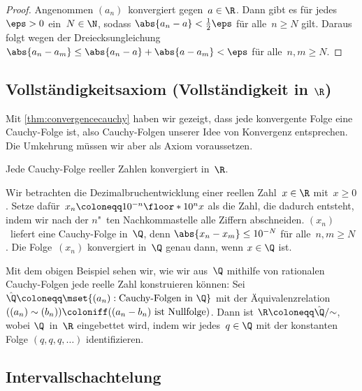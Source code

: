 \documentclass[a4paper]{article}
\begin{document}
\begin{proof}
    Angenommen $(a_n)$~konvergiert gegen~$a \in \R$. Dann gibt es für jedes~$\eps > 0$ ein~$N \in \N$, sodass $\abs{a_n - a} < \frac{1}{2}\eps$ für alle~$n \geq N$ gilt. Daraus folgt wegen der Dreiecksungleichung $\abs{a_n - a_m} \leq \abs{a_n - a} + \abs{a - a_m} < \eps$ für alle~$n, m \geq N$.
\end{proof}

\subsection{Vollständigkeitsaxiom (Vollständigkeit in \texorpdfstring{$\R$}{R})}\label{subsec:completeness}

Mit \cref{thm:convergencecauchy} haben wir gezeigt, dass jede konvergente Folge eine Cauchy-Folge ist, also Cauchy-Folgen unserer Idee von Konvergenz entsprechen. Die Umkehrung müssen wir aber als Axiom voraussetzen.

\begin{axiom}[Vollständigkeitsaxiom]
    Jede Cauchy-Folge reeller Zahlen konvergiert in~$\R$.
\end{axiom}

\begin{example}
    Wir betrachten die Dezimalbruchentwicklung einer reellen Zahl~$x \in \R$ mit~$x \geq 0$. Setze dafür~$x_n \coloneqq 10^{-n} \floor*{10^n x}$ als die Zahl, die dadurch entsteht, indem wir nach der $n$"~ten Nachkommastelle alle Ziffern abschneiden. $(x_n)$~liefert eine Cauchy-Folge in~$\Q$, denn $\abs{x_n - x_m} \leq 10^{-N}$ für alle~$n, m \geq N$. Die Folge~$(x_n)$ konvergiert in~$\Q$ genau dann, wenn $x \in \Q$ ist.
\end{example}

Mit dem obigen Beispiel sehen wir, wie wir aus~$\Q$ mithilfe von rationalen Cauchy-Folgen jede reelle Zahl konstruieren können: Sei~$\hat{\Q} \coloneqq \mset{(a_n) : \text{Cauchy-Folgen in }\Q}$ mit der Äquivalenzrelation $((a_n) \sim (b_n)) \coloniff ((a_n - b_n) \text{ ist Nullfolge})$. Dann ist $\R \coloneqq \hat{\Q}/{\sim}$, wobei $\Q$~in~$\R$ eingebettet wird, indem wir jedes~$q \in \Q$ mit der konstanten Folge $(q, q, q, \dots)$ identifizieren.

\subsection{Intervallschachtelung}
\end{document}
